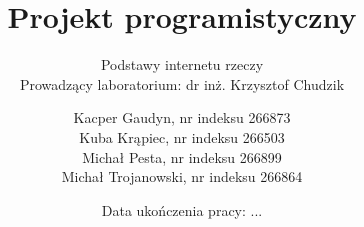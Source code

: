 \documentclass[10pt, a4paper, titlepage]{article}
\title{Projekt programistyczny}
\subtitle{
  Podstawy internetu rzeczy \\
  Prowadzący laboratorium: dr inż. Krzysztof Chudzik
}
\author{
  Kacper Gaudyn, nr indeksu 266873 \\
  Kuba Krąpiec, nr indeksu 266503 \\
  Michał Pesta, nr indeksu 266899 \\
  Michał Trojanowski, nr indeksu 266864
}
\date{Data ukończenia pracy: ...}
\begin{document}
  \begin{titlingpage}
    \maketitle
  \end{titlingpage}
  \tableofcontents

  \newpage
  
  
\end{document}
